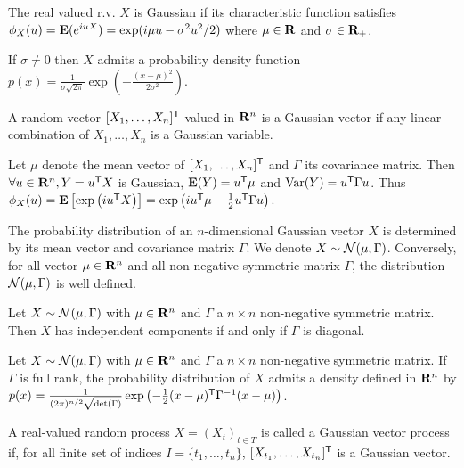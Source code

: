 	\begin{defn}
		The real valued r.v. $X$ is Gaussian if its characteristic function satisfies
		$\phi_X(u) = \mathbf{E}(e^{iuX}) = \exp(i \mu u - \sigma^2 u^2 / 2)$
		where $\mu \in \mathbf{R}$ and $\sigma \in \mathbf{R}_+$.
	\end{defn}

	If $\sigma \neq 0$ then $X$ admits a probability density function $p(x) = \frac{1}{\sigma \sqrt{2 \pi}} \exp \left( - \frac{(x - \mu)^2}{2 \sigma^2} \right)$.

	\begin{defn}
		A random vector $[X_1, \ldots, X_n]^\mathsf{T}$ valued in $\mathbf{R}^n$ is a Gaussian vector if any linear combination of $X_1, \ldots, X_n$ is a Gaussian variable.
	\end{defn}

	Let $\mu$ denote the mean vector of $[X_1, \ldots, X_n]^\mathsf{T}$ and $\Gamma$ its covariance matrix.
	Then $\forall u \in \mathbf{R}^n, Y = u^\mathsf{T} X$ is Gaussian, $\mathbf{E}(Y) = u^\mathsf{T} \mu$ and $\operatorname{Var}(Y) = u^\mathsf{T} \Gamma u$.
	Thus $\phi_X(u) = \mathbf{E} \left[ \exp \left( i u^\mathsf{T} X \right) \right] = \exp \left( i u^\mathsf{T} \mu - \frac{1}{2} u^\mathsf{T} \Gamma u \right)$.
	
	\begin{pop}
		The probability distribution of an $n$-dimensional Gaussian vector $X$ is determined by its mean vector and covariance matrix $\Gamma$.
		We denote $X \sim \mathcal{N}(\mu,\Gamma)$.
		Conversely, for all vector $\mu \in \mathbf{R}^n$ and all non-negative symmetric matrix $\Gamma$, the distribution $\mathcal{N}(\mu,\Gamma)$ is well defined.
	\end{pop}

	\begin{lem}
		Let $X \sim \mathcal{N}(\mu,\Gamma)$ with $\mu \in \mathbf{R}^n$ and $\Gamma$ a $n \times n$ non-negative symmetric matrix.
		Then $X$ has independent components if and only if $\Gamma$ is diagonal.
	\end{lem}

	\begin{pop}
		Let $X \sim \mathcal{N}(\mu,\Gamma)$ with $\mu \in \mathbf{R}^n$ and $\Gamma$ a $n \times n$ non-negative symmetric matrix.
		If $\Gamma$ is full rank, the probability distribution of $X$ admits a density defined in $\mathbf{R}^n$ by
		$p(x) = \frac{1}{(2 \pi)^{n/2} \sqrt{\det(\Gamma)}} \exp \left( - \frac{1}{2} (x - \mu)^\mathsf{T} \Gamma^{-1} (x - \mu) \right)$.
	\end{pop}

	\begin{defn}
		A real-valued random process $X = (X_t)_{t \in T}$ is called a Gaussian vector process if, for all finite set of indices $I = \{ t_1, \ldots, t_n \}$, $[X_{t_1}, \ldots, X_{t_n}]^\mathsf{T}$ is a Gaussian vector.
	\end{defn}

	

